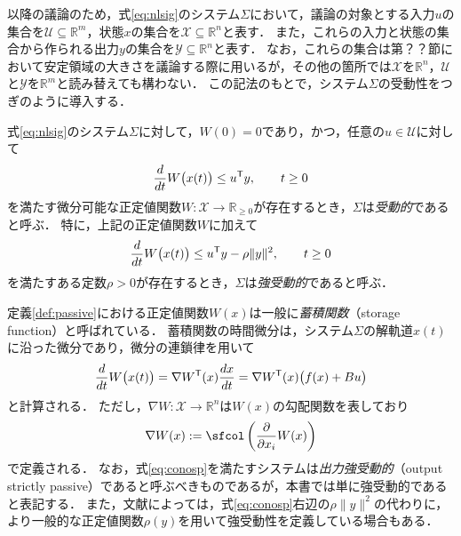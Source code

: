\documentclass[a4j,10pt,oneside,openany,dvipdfmx]{jsbook}
\begin{document}
以降の議論のため，式\eqref{eq:nlsig}のシステム$\Sigma$において，議論の対象とする入力$u$の集合を$\mathcal{U}\subseteq \mathbb{R}^m$，状態$x$の集合を$\mathcal{X} \subseteq \mathbb{R}^n$と表す．
また，これらの入力と状態の集合から作られる出力$y$の集合を$\mathcal{Y} \subseteq \mathbb{R}^n$と表す．
なお，これらの集合は第？？節において安定領域の大きさを議論する際に用いるが，その他の箇所では$\mathcal{X}$を$\mathbb{R}^n$，$\mathcal{U}$と$\mathcal{Y}$を$\mathbb{R}^m$と読み替えても構わない．
この記法のもとで，システム$\Sigma$の受動性をつぎのように導入する．

\begin{definition}\label{def:passive}
式\eqref{eq:nlsig}のシステム$\Sigma$に対して，$W(0)=0$であり，かつ，任意の$u \in \mathcal{U}$に対して
\begin{equation}\label{eq:conpv}
\frac{d}{dt} W\bigl( x(t) \bigr) \leq u^{\sf T} y
,\qquad
t \geq 0
\end{equation}
を満たす微分可能な正定値関数$W:\mathcal{X} \rightarrow \mathbb{R}_{\geq 0}$が存在するとき，$\Sigma$は\emph{受動的}であると呼ぶ．
特に，上記の正定値関数$W$に加えて
\begin{equation}\label{eq:conosp}
\frac{d}{dt} W\bigl( x(t) \bigr) \leq u^{\sf T} y -\rho\|y\|^2
,\qquad
t \geq 0
\end{equation}
を満たすある定数$\rho >0$が存在するとき，$\Sigma$は\emph{強受動的}であると呼ぶ．
\end{definition}

定義\ref{def:passive}における正定値関数$W(x)$は一般に\emph{蓄積関数}（storage function）と呼ばれている．
蓄積関数の時間微分は，システム$\Sigma$の解軌道$x(t)$に沿った微分であり，微分の連鎖律を用いて
\[
\frac{d}{dt} W\bigl( x(t) \bigr)
= \nabla W^{\sf T} (x) \frac{dx}{dt} = \nabla W^{\sf T} (x) 
\bigl( 
f(x) + Bu
\bigr)
\]
と計算される．
ただし，$\nabla W:\mathcal{X} \rightarrow \mathbb{R}^n$は$W(x)$の勾配関数を表しており
\[
\nabla W(x) := \sfcol \left( 
\frac{\partial }{\partial x_i}W(x)
\right)
\]
で定義される．
なお，式\eqref{eq:conosp}を満たすシステムは\emph{出力強受動的}（output strictly passive）であると呼ぶべきものであるが，本書では単に強受動的であると表記する．
また，文献によっては，式\eqref{eq:conosp}右辺の$\rho\|y\|^2$の代わりに，より一般的な正定値関数$\rho(y)$を用いて強受動性を定義している場合もある．
\end{document}
